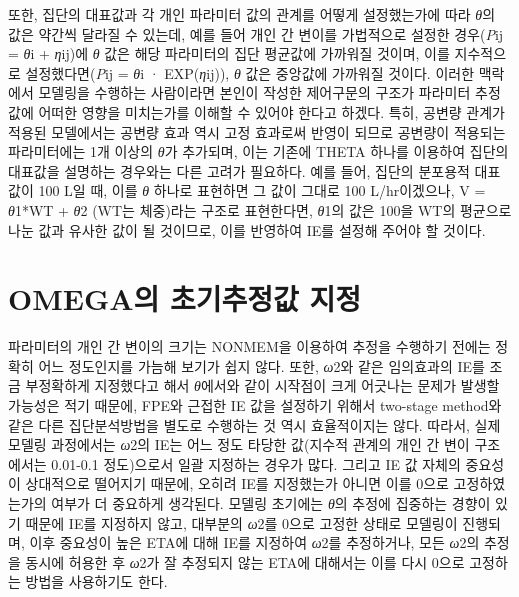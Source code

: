 \documentclass[
  10pt,
]{krantz}
\begin{document}
또한, 집단의 대표값과 각 개인 파라미터 값의 관계를 어떻게 설정했는가에 따라 \emph{θ}의 값은 약간씩 달라질 수 있는데, 예를 들어
개인 간 변이를 가법적으로 설정한 경우(\emph{P}ij = \emph{θ}i +
\emph{η}ij)에 \emph{θ} 값은 해당 파라미터의 집단 평균값에 가까워질 것이며, 이를 지수적으로
설정했다면(\emph{P}ij = \emph{θ}i ·
EXP(\emph{η}ij)), \emph{θ} 값은 중앙값에 가까워질 것이다. 이러한 맥락에서 모델링을 수행하는 사람이라면
본인이 작성한 제어구문의 구조가 파라미터 추정값에 어떠한 영향을 미치는가를 이해할 수 있어야 한다고 하겠다. 특히, 공변량
관계가 적용된 모델에서는 공변량 효과 역시 고정 효과로써 반영이 되므로 공변량이 적용되는 파라미터에는 1개 이상의 \emph{θ}가
추가되며, 이는 기존에 THETA 하나를 이용하여 집단의 대표값을 설명하는 경우와는 다른 고려가 필요하다. 예를 들어, 집단의
분포용적 대표값이 100 L일 때, 이를 \emph{θ} 하나로 표현하면 그 값이 그대로 100 L/hr이겠으나, V =
\emph{θ}1*WT + \emph{θ}2 (WT는 체중)라는 구조로 표현한다면,
\emph{θ}1의 값은 100을 WT의 평균으로 나눈 값과 유사한 값이 될 것이므로, 이를 반영하여 IE를 설정해
주어야 할 것이다.

\hypertarget{omegauxc758-uxcd08uxae30uxcd94uxc815uxac12-uxc9c0uxc815}{%
\section{OMEGA의 초기추정값 지정}\label{omegauxc758-uxcd08uxae30uxcd94uxc815uxac12-uxc9c0uxc815}}

파라미터의 개인 간 변이의 크기는 NONMEM을 이용하여 추정을 수행하기 전에는 정확히 어느 정도인지를 가늠해 보기가 쉽지 않다.
또한, \emph{ω}2와 같은 임의효과의 IE를 조금 부정확하게 지정했다고 해서 \emph{θ}에서와 같이 시작점이 크게
어긋나는 문제가 발생할 가능성은 적기 때문에, FPE와 근접한 IE 값을 설정하기 위해서 two-stage
method와 같은 다른 집단분석방법을 별도로 수행하는 것 역시 효율적이지는 않다. 따라서, 실제 모델링 과정에서는
\emph{ω}2의 IE는 어느 정도 타당한 값(지수적 관계의 개인 간 변이 구조에서는 0.01-0.1 정도)으로서
일괄 지정하는 경우가 많다. 그리고 IE 값 자체의 중요성이 상대적으로 떨어지기 때문에, 오히려 IE를 지정했는가 아니면 이를
0으로 고정하였는가의 여부가 더 중요하게 생각된다. 모델링 초기에는 \emph{θ}의 추정에 집중하는 경향이 있기 때문에 IE를 지정하지
않고, 대부분의 \emph{ω}2를 0으로 고정한 상태로 모델링이 진행되며, 이후 중요성이 높은 ETA에 대해
IE를 지정하여 \emph{ω}2를 추정하거나, 모든 \emph{ω}2의 추정을 동시에 허용한 후
\emph{ω}2가 잘 추정되지 않는 ETA에 대해서는 이를 다시 0으로 고정하는 방법을 사용하기도 한다.
\end{document}
